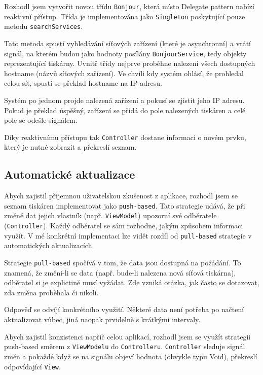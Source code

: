 Rozhodl jsem vytvořit novou třídu \texttt{Bonjour}, která místo Delegate pattern nabízí reaktivní přístup.
Třída je implementována jako \texttt{Singleton} \cite{thatthinginswift-singletons} poskytující pouze metodu \texttt{searchServices}.

Tato metoda spustí vyhledávání síťových zařízení (které je asynchronní) a vrátí signál, na kterém budou jako hodnoty posílány \texttt{BonjourService}, tedy objekty reprezentující tiskárny.
Uvnitř třídy nejprve proběhne nalezení všech dostupných hostname (názvů síťových zařízení).
Ve chvíli kdy systém ohlásí, že prohledal celou síť, spustí se překlad hostname na IP adresu.

Systém po jednom projde nalezená zařízení a pokusí se zjistit jeho IP adresu.
Pokud je překlad úspěšný, zařízení se přidá do pole nalezených tiskáren a celé pole se odešle signálem.

Díky reaktivnímu přístupu tak \texttt{Controller} dostane informaci o novém prvku, který je nutné zobrazit a překreslí seznam.

\subsection{Automatické aktualizace}

Abych zajistil přijemnou uživatelskou zkušenost z aplikace, rozhodl jsem se seznam tiskáren implementovat jako \texttt{push-based}.
Tato strategie udává, že při změně dat jejich vlastník (např. \texttt{ViewModel}) upozorní své odběratele (\texttt{Controller}).
Každý odběratel se sám rozhodne, jakým způsobem informaci využít.
V mé konkrétní implementaci lze vidět rozdíl od \texttt{pull-based} strategie v automatických aktualizacích.

Strategie \texttt{pull-based} spočívá v tom, že data jsou dostupná na požádání.
To znamená, že změní-li se data (např. bude-li nalezena nová síťová tiskárna), odběratel si je explictině musí vyžádat.
Zde vzniká otázka, jak často se dotazovat, zda změna proběhala či nikoli.

Odpověď se odvíjí konkrétního využití.
Některé data není potřeba po načtení aktualizovat vůbec, jiná naopak prvidelně s krátkými intervaly.

\bigskip

Abych zajistil konzistenci napříč celou aplikací, rozhodl jsem se využít strategii push-based směrem z \texttt{ViewModelu} do \texttt{Controlleru}.
\texttt{Controller} sleduje signál změn a pokaždé když se na signálu objeví hodnota (obvykle typu Void), překreslí odpovídající \texttt{View}.

